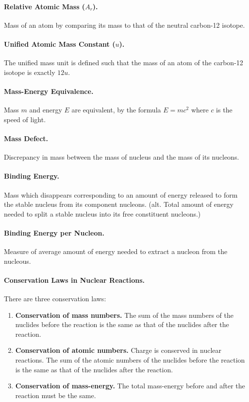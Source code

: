 \documentclass{article}
\begin{document}
\paragraph{Relative Atomic Mass ($A_r$).} Mass of an atom by comparing its mass
to that of the neutral carbon-12 isotope.

\paragraph{Unified Atomic Mass Constant ($u$).} The unified mass unit is defined
such that the mass of an atom of the carbon-12 isotope is exactly $12u$.

\paragraph{Mass-Energy Equivalence.} Mass $m$ and energy $E$ are equivalent, by
the formula $E = mc^2$ where $c$ is the speed of light.

\paragraph{Mass Defect.} Discrepancy in mass between the mass of nucleus and the
mass of its nucleons.

\paragraph{Binding Energy.} Mass which disappears corresponding to an amount of
energy released to form the stable nucleus from its component nucleons. (alt.
Total amount of energy needed to split a stable nucleus into its free
constituent nucleons.)

\paragraph{Binding Energy per Nucleon.} Measure of average amount of energy
needed to extract a nucleon from the nucleous.

\paragraph{Conservation Laws in Nuclear Reactions.} There are three conservation
laws: \begin{enumerate} \item \textbf{Conservation of mass numbers.} The sum of
      the mass numbers of the nuclides before the reaction is the same as that
      of the nuclides after the reaction.  \item \textbf{Conservation of atomic
        numbers.} Charge is conserved in nuclear reactions. The sum of the
        atomic numbers of the nuclides before the reaction is the same as that
        of the nuclides after the reaction.  \item \textbf{Conservation of
mass-energy.} The total mass-energy before and after the reaction must be the
same.  \end{enumerate}
\end{document}
